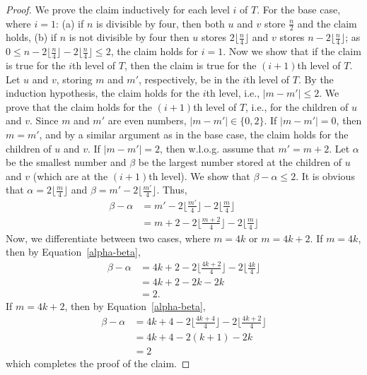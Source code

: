 \documentclass[11pt,a4paper]{article}
\begin{document}
\begin{proof}
We prove the claim inductively for each level $i$ of $T$. For the base case, where $i=1$: (a) if $n$ is divisible by four, then both $u$ and $v$ store $\frac{n}{2}$ and the claim holds, (b) if $n$ is not divisible by four then $u$ stores $2\lfloor\frac{n}{4}\rfloor$ and $v$ stores $n-2\lfloor\frac{n}{4}\rfloor$; as $0\le n-2\lfloor\frac{n}{4}\rfloor-2\lfloor\frac{n}{4}\rfloor\le 2$, the claim holds for $i=1$. 
Now we show that if the claim is true for the $i$th level of $T$, then the claim is true for the $(i+1)$th level of $T$.
Let $u$ and $v$, storing $m$ and $m'$, respectively, be in the $i$th level of $T$. By the induction hypothesis, the claim holds for the $i$th level, i.e., $|m-m'|\le 2$. We prove that the claim holds for the $(i+1)$th level of $T$, i.e., for the children of $u$ and $v$. Since $m$ and $m'$ are even numbers, $|m-m'|\in\{0,2\}$. If $|m-m'|=0$, then $m=m'$, and by a similar argument as in the base case, the claim holds for the children of $u$ and $v$. If $|m-m'|=2$, then w.l.o.g. assume that $m'=m+2$. Let $\alpha$ be the smallest number and $\beta$ be the largest number stored at the children of $u$ and $v$ (which are at the $(i+1)$th level). We show that $\beta-\alpha \le 2$. It is obvious that $\alpha= 2\lfloor\frac{m}{4}\rfloor$ and $\beta= m'-2\lfloor\frac{m'}{4}\rfloor$. Thus,
\begin{align}
\label{alpha-beta}
\beta-\alpha & = m'-2\lfloor\frac{m'}{4}\rfloor-2\lfloor\frac{m}{4}\rfloor\nonumber\\
       & = m+2-2\lfloor\frac{m+2}{4}\rfloor-2\lfloor\frac{m}{4}\rfloor 
\end{align}
Now, we differentiate between two cases, where $m=4k$ or $m=4k+2$. If $m=4k$, then by Equation~\ref{alpha-beta},
\begin{align}
\beta-\alpha & = 4k+2-2\lfloor\frac{4k+2}{4}\rfloor-2\lfloor\frac{4k}{4}\rfloor\nonumber\\
       & = 4k+2-2k-2k\nonumber\\
	&= 2.\nonumber
\end{align}
If $m=4k+2$, then by Equation~\ref{alpha-beta},
\begin{align}
\beta-\alpha & = 4k+4-2\lfloor\frac{4k+4}{4}\rfloor-2\lfloor\frac{4k+2}{4}\rfloor\nonumber\\
       & = 4k+4-2(k+1)-2k\nonumber\\
	&= 2\nonumber
\end{align}
which completes the proof of the claim.
\vspace{10pt}


\end{proof}
\end{document}
